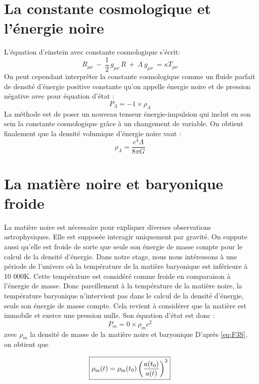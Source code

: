 \documentclass[10pt, a4paper]{report}
\numberwithin{equation}{subsection}
\begin{document}
\section{La constante cosmologique et l'énergie noire}
L'équation d'einstein avec constante cosmologique s'écrit:
\begin{equation} \label{eq:EFEL}
\boxed{R_{\mu \nu} \ - \ \frac{1}{2} \, g_{\mu \nu} \, R  \ + \ \Lambda \ g_{\mu \nu} \ =  \kappa T_{\mu \nu}}
\end{equation}
On peut cependant interprêter la constante cosmologique comme un fluide parfait de densité d'énergie positive constante qu'on appelle énergie noire et de pression négative avec pour équation d'état :
\begin{equation} \label{eq:EEL}
\boxed{P_\Lambda=-1 \times \rho_\Lambda}
\end{equation}
La méthode est de poser un nouveau tenseur énergie-impulsion qui inclut en son sein la constante cosmologique grâce à un changement de variable. On obtient finalement que la densité volumique d'énergie noire vaut :
\begin{equation} \label{eq:DEL}
\boxed{\rho_{\Lambda}  =  \frac{c^4 \Lambda}{8\pi G}}
\end{equation}

\section{La matière noire et baryonique froide}
La matière noire est nécessaire pour expliquer diverses observations astrophysiques. Elle est supposée interagir uniquement par gravité. On suppute aussi qu'elle est froide de sorte que seule son énergie de masse compte pour le calcul de la densité d'énergie. 
Dans notre stage, nous nous intéressons à une période de l'univers où la température de la matière baryonique est inférieure à 10 000K. Cette température est considéré comme froide en comparaison à l'énergie de masse. Donc pareillement à la température de la matière noire, la température baryonique n'intervient pas dans le calcul de la densité d'énergie, seule son énergie de masse compte. Cela revient à considérer que la matière est immobile et exerce une pression nulle.
Son équation d'état est donc :
\begin{equation} \label{eq:EEM}
\boxed{P_m=0 \times \rho_m c^2}
\end{equation}
avec $\rho_m$ la densité de masse de la matière noire et baryonique
D'après \ref{eq:F3S}, on obtient que

\begin{equation} \label{eq:DEM}
\boxed{\rho_{\rm m}(t) = \rho_{\rm m}(t_0) \left(\frac{a(t_0)}{a(t)}\right)^3}
\end{equation}
\end{document}
